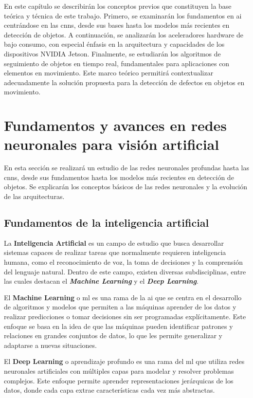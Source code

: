 \documentclass[11pt,spanish,listoffigures,listoftables]{tfgetsinf}
\begin{document}
En este capítulo se describirán los conceptos previos que constituyen la base teórica y técnica de este trabajo. Primero, se examinarán los fundamentos en \gls{ai} centrándose en las \glspl{cnn}, desde sus bases hasta los modelos más recientes en detección de objetos. A continuación, se analizarán los aceleradores hardware de bajo consumo, con especial énfasis en la arquitectura y capacidades de los dispositivos NVIDIA Jetson. Finalmente, se estudiarán los algoritmos de seguimiento de objetos en tiempo real, fundamentales para aplicaciones con elementos en movimiento. Este marco teórico permitirá contextualizar adecuadamente la solución propuesta para la detección de defectos en objetos en movimiento.

\section{Fundamentos y avances en redes neuronales para visión artificial} \label{sec:fundamentos_avances}
En esta sección se realizará un estudio de las redes neuronales profundas hasta las \glspl{cnn}, desde sus fundamentos hasta los modelos más recientes en detección de objetos. Se explicarán los conceptos básicos de las redes neuronales y la evolución de las arquitecturas.

\subsection{Fundamentos de la inteligencia artificial} \label{sec:fundamentos_inteligencia_artificial}
La \textbf{Inteligencia Artificial} es un campo de estudio que busca desarrollar sistemas capaces de realizar tareas que normalmente requieren inteligencia humana, como el reconocimiento de voz, la toma de decisiones y la comprensión del lenguaje natural. Dentro de este campo, existen diversas 
subdisciplinas, entre las cuales destacan el \textit{\textbf{Machine Learning}} y el \textit{\textbf{Deep Learning}}.

El \textbf{Machine Learning} o \gls{ml} es una rama de la \gls{ai} que se centra en el desarrollo de algoritmos y modelos que permiten a las máquinas aprender de los datos y realizar predicciones o tomar decisiones sin ser programadas explícitamente. Este enfoque se basa en la idea de que las máquinas pueden identificar patrones y relaciones en grandes conjuntos de datos, lo que les permite generalizar y adaptarse a nuevas situaciones.

El \textbf{Deep Learning} o aprendizaje profundo es una rama del \gls{ml} que utiliza redes neuronales artificiales con múltiples capas para modelar y resolver problemas complejos. Este enfoque permite aprender representaciones jerárquicas de los datos, donde cada capa extrae características cada vez más abstractas. 
\end{document}
